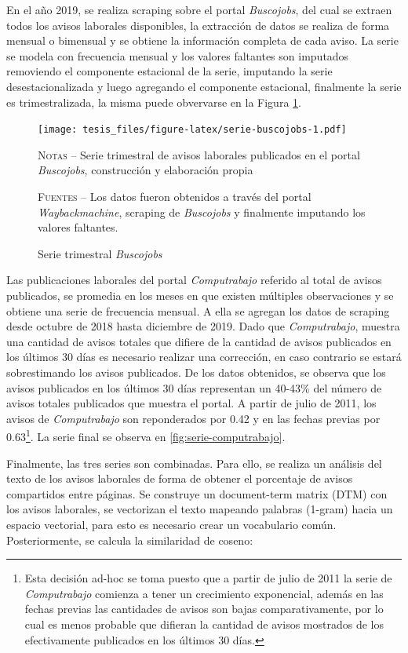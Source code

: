 \documentclass[12pt,oneside]{reedthesis}
\begin{document}
En el año 2019, se realiza scraping sobre el portal \emph{Buscojobs}, del cual se extraen todos los avisos laborales disponibles, la extracción de datos se realiza de forma mensual o bimensual y se obtiene la información completa de cada aviso.
La serie se modela con frecuencia mensual y los valores faltantes son imputados removiendo el componente estacional de la serie, imputando la serie desestacionalizada y luego agregando el componente estacional, finalmente la serie es trimestralizada, la misma puede obvervarse en la Figura \ref{fig:serie-buscojobs}.
\begin{figure}
\texttt{[image: tesis\_files/figure-latex/serie-buscojobs-1.pdf]}
\caption{Serie trimestral \textit{Buscojobs}}\label{fig:serie-buscojobs}\textsc{}

\footnotesize\textsc{Notas} -- Serie trimestral de avisos laborales publicados en el portal \textit{Buscojobs}, construcción y elaboración propia

\textsc{Fuentes} -- Los datos fueron obtenidos a través del portal \textit{Waybackmachine}, scraping de \textit{Buscojobs} y finalmente imputando los valores faltantes.
\end{figure}
Las publicaciones laborales del portal \emph{Computrabajo} referido al total de avisos publicados, se promedia en los meses en que existen múltiples observaciones y se obtiene una serie de frecuencia mensual. A ella se agregan los datos de scraping desde octubre de 2018 hasta diciembre de 2019. Dado que \emph{Computrabajo}, muestra una cantidad de avisos totales que difiere de la cantidad de avisos publicados en los últimos 30 días es necesario realizar una corrección, en caso contrario se estará sobrestimando los avisos publicados. De los datos obtenidos, se observa que los avisos publicados en los últimos 30 días representan un 40-43\% del número de avisos totales publicados que muestra el portal. A partir de julio de 2011, los avisos de \emph{Computrabajo} son reponderados por 0.42 y en las fechas previas por 0.63\footnote{Esta decisión ad-hoc se toma puesto que a partir de julio de 2011 la serie de \emph{Computrabajo} comienza a tener un crecimiento exponencial, además en las fechas previas las cantidades de avisos son bajas comparativamente, por lo cual es menos probable que difieran la cantidad de avisos mostrados de los efectivamente publicados en los últimos 30 días.}. La serie final se observa en \ref{fig:serie-computrabajo}.

Finalmente, las tres series son combinadas. Para ello, se realiza un análisis del texto de los avisos laborales de forma de obtener el porcentaje de avisos compartidos entre páginas. Se construye un document-term matrix (DTM) con los avisos laborales, se vectorizan el texto mapeando palabras (1-gram) hacia un espacio vectorial, para esto es necesario crear un vocabulario común. Posteriormente, se calcula la similaridad de coseno:
\end{document}

